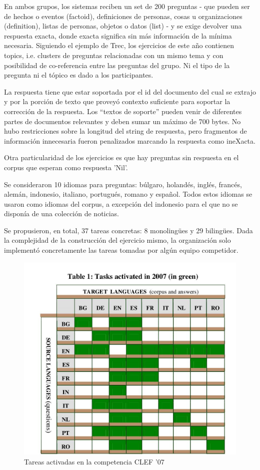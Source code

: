 En ambos grupos, los sistemas reciben un set de 200 preguntas - que pueden ser de hechos o eventos (factoid), definiciones de personas, cosas u organizaciones (definition), listas de personas, objetos o datos (list) - y se exige devolver una respuesta exacta, donde exacta significa sin más información de la mínima necesaria. Siguiendo el ejemplo de Trec, los ejercicios de este año contienen topics, i.e. clusters de preguntas relacionadas con un mismo tema y con posibilidad de co-referencia entre las preguntas del grupo. Ni el tipo de la pregunta ni el tópico es dado a los participantes.

La respuesta tiene que estar soportada por el id del documento del cual se extrajo y por la porción de texto que proveyó contexto suficiente para soportar la corrección de la respuesta. Los “textos de soporte” pueden venir de diferentes partes de documentos relevantes y deben sumar un máximo de 700 bytes. No hubo restricciones sobre la longitud del string de respuesta, pero fragmentos de información innecesaria fueron penalizados marcando la respuesta como ineXacta.

Otra particularidad de los ejercicios es que hay preguntas sin respuesta en el corpus que esperan como respuesta 'Nil'.


Se consideraron 10 idiomas para preguntas: búlgaro, holandés, inglés, francés, alemán, indonesio, italiano, portugués, romano y español. Todos estos idiomas se usaron como idiomas del corpus, a excepción del indonesio para el que no se disponía de una colección de noticias.

Se propusieron, en total, 37 tareas concretas: 8 monolingües y 29 bilingües. Dada la complejidad de la construcción del ejercicio mismo, la organización solo implementó concretamente las tareas tomadas por algún equipo competidor.


\begin{figure}
  \centering
    \includegraphics[scale=0.5]{graficos/clef07}
  \caption{Tareas activadas en la competencia CLEF '07}
  \label{fig:tareas}
\end{figure}

